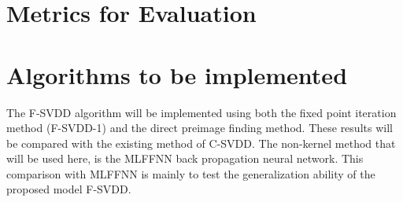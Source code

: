 \documentclass{article}
\begin{document}
\section{Metrics for Evaluation}

\section{Algorithms to be implemented}

The F-SVDD algorithm will be implemented using both the fixed point iteration method (F-SVDD-1) and the direct preimage finding method. These results will be compared with the existing method of C-SVDD. The non-kernel method that will be used here, is the MLFFNN back propagation neural network. This comparison with MLFFNN is mainly to test the generalization ability of the proposed model F-SVDD.
\end{document}
